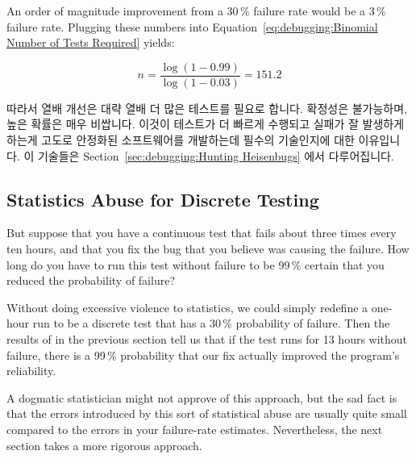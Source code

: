 An order of magnitude improvement from a 30\,\% failure rate would be
a 3\,\% failure rate.
Plugging these numbers into
Equation~\ref{eq:debugging:Binomial Number of Tests Required} yields:

\fi

\begin{equation}
	n = \frac{\log\left(1 - 0.99\right)}{\log\left(1 - 0.03\right)} = 151.2
\end{equation}

따라서 열배 개선은 대략 열배 더 많은 테스트를 필요로 합니다.
확정성은 불가능하며, 높은 확률은 매우 비쌉니다.
이것이 테스트가 더 빠르게 수행되고 실패가 잘 발생하게 하는게 고도로 안정화된
소프트웨어를 개발하는데 필수의 기술인지에 대한 이유입니다.
이 기술들은
Section~\ref{sec:debugging:Hunting Heisenbugs} 에서 다루어집니다.

\subsection{Statistics Abuse for Discrete Testing}
\label{sec:debugging:Statistics Abuse for Discrete Testing}

But suppose that you have a continuous test that fails about three
times every ten hours, and that you fix the bug that you believe was
causing the failure.
How long do you have to run this test without failure to be 99\,\% certain
that you reduced the probability of failure?

Without doing excessive violence to statistics, we could simply
redefine a one-hour run to be a discrete test that has a 30\,\%
probability of failure.
Then the results of in the previous section tell us that if the test
runs for 13 hours without failure, there is a 99\,\% probability that
our fix actually improved the program's reliability.

A dogmatic statistician might not approve of this approach, but the sad
fact is that the errors introduced by this sort of statistical abuse are
usually quite small compared to the errors in your failure-rate estimates.
Nevertheless, the next section takes a more rigorous approach.

